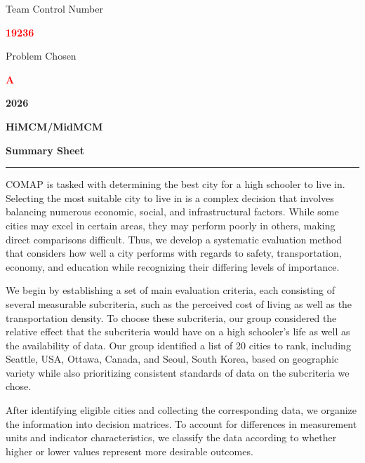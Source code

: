 \documentclass[11pt,letterpaper]{article}
\begin{document}
\fontsize{11.3}{13.75}\selectfont
\hypertarget{summary-sheet}{}\label{tocentry:0-0}
\thispagestyle{empty}
\vspace*{-0.38in}
\begin{center}
\vspace*{0pt}
{\small Team Control Number\par}
{\fontsize{20}{22}\selectfont\bfseries\textcolor{red}{19236}\par}
\vspace{-3pt}
{\small Problem Chosen\par}
{\fontsize{20}{22}\selectfont\bfseries\textcolor{red}{A}\par}
{\bfseries 2026\par}
{\bfseries HiMCM/MidMCM\par}
{\bfseries Summary Sheet\par}
\end{center}
\vspace{-0.14in}
\noindent\rule{\textwidth}{0.25pt}\par\vspace{0.10in}
\begingroup
\setlength{\parindent}{1.1em}
\setlength{\parskip}{0.28em}
\fontsize{10.6}{13.35}\selectfont
\setlength{\lineskiplimit}{0pt}
COMAP is tasked with determining the best city for a high schooler to live in. Selecting the most suitable city to live in is a complex decision that involves balancing numerous economic, social, and infrastructural factors. While some cities may excel in certain areas, they may perform poorly in others, making direct comparisons difficult. Thus, we develop a systematic evaluation method that considers how well a city performs with regards to safety, transportation, economy, and education while recognizing their differing levels of importance.\par

We begin by establishing a set of main evaluation criteria, each consisting of several measurable subcriteria, such as the perceived cost of living as well as the transportation density. To choose these subcriteria, our group considered the relative effect that the subcriteria would have on a high schooler's life as well as the availability of data. Our group identified a list of 20 cities to rank, including Seattle, USA, Ottawa, Canada, and Seoul, South Korea, based on geographic variety while also prioritizing consistent standards of data on the subcriteria we chose.

After identifying eligible cities and collecting the corresponding data, we organize the information into decision matrices. To account for differences in measurement units and indicator characteristics, we classify the data according to whether higher or lower values represent more desirable outcomes.
\end{document}
